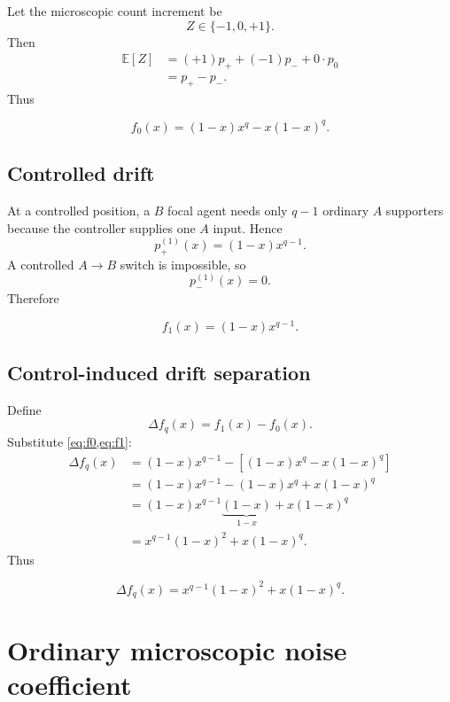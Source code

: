 \documentclass[11pt,a4paper]{article}
\newcommand{\E}{\mathbb{E}}
\newcommand{\1}{\mathbbm{1}}
\begin{document}
Let the microscopic count increment be
\[
Z\in\{-1,0,+1\}.
\]
Then
\begin{align}
\E[Z]
&=(+1)p_++(-1)p_-+0\cdot p_0\\
&=p_+-p_-.
\end{align}
Thus
\begin{resultbox}
\begin{equation}
\boxed{
f_0(x)=(1-x)x^q-x(1-x)^q.}
\label{eq:f0}
\end{equation}
\end{resultbox}

\subsection{Controlled drift}

At a controlled position, a $B$ focal agent needs only $q-1$ ordinary $A$ supporters because the controller supplies one $A$ input. Hence
\[
p_+^{(1)}(x)=(1-x)x^{q-1}.
\]
A controlled $A\to B$ switch is impossible, so
\[
p_-^{(1)}(x)=0.
\]
Therefore
\begin{resultbox}
\begin{equation}
\boxed{f_1(x)=(1-x)x^{q-1}.}
\label{eq:f1}
\end{equation}
\end{resultbox}

\subsection{Control-induced drift separation}

Define
\[
\Delta f_q(x)=f_1(x)-f_0(x).
\]
Substitute \cref{eq:f0,eq:f1}:
\begin{align}
\Delta f_q(x)
&=(1-x)x^{q-1}-\left[(1-x)x^q-x(1-x)^q\right]\\
&=(1-x)x^{q-1}-(1-x)x^q+x(1-x)^q\\
&=(1-x)x^{q-1}\underbrace{(1-x)}_{1-x}+x(1-x)^q\\
&=x^{q-1}(1-x)^2+x(1-x)^q.
\end{align}
Thus
\begin{resultbox}
\begin{equation}
\boxed{
\Delta f_q(x)=x^{q-1}(1-x)^2+x(1-x)^q.}
\label{eq:deltaf}
\end{equation}
\end{resultbox}

\section{Ordinary microscopic noise coefficient}
\end{document}
